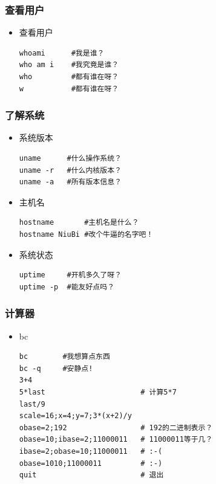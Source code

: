 \documentclass[xcolor=svgnames,bigger,presentation]{beamer}
\begin{document}
\begin{frame}[fragile]
\frametitle{查看用户}
\label{sec-4-2-6}
\begin{itemize}

\item 查看用户\\
\label{sec-4-2-6-1}%
\begin{verbatim}
whoami      #我是谁？
who am i    #我究竟是谁？
who         #都有谁在呀？
w           #都有谁在呀？
\end{verbatim}
\end{itemize} %
\end{frame}
\begin{frame}[fragile]
\frametitle{了解系统}
\label{sec-4-2-7}
\begin{itemize}

\item 系统版本\\
\label{sec-4-2-7-1}%
\begin{verbatim}
uname      #什么操作系统？
uname -r   #什么内核版本？
uname -a   #所有版本信息？
\end{verbatim}

\item 主机名\\
\label{sec-4-2-7-2}%
\begin{verbatim}
hostname       #主机名是什么？
hostname NiuBi #改个牛逼的名字吧！
\end{verbatim}

\item 系统状态\\
\label{sec-4-2-7-3}%
\begin{verbatim}
uptime     #开机多久了呀？
uptime -p  #能友好点吗？
\end{verbatim}
\end{itemize} %
\end{frame}
\begin{frame}[fragile]
\frametitle{计算器}
\label{sec-4-2-8}
\begin{itemize}

\item bc\\
\label{sec-4-2-8-1}%
\begin{verbatim}
bc        #我想算点东西
bc -q     #安静点!
3+4
5*last                      # 计算5*7
last/9
scale=16;x=4;y=7;3*(x+2)/y
obase=2;192                 # 192的二进制表示？
obase=10;ibase=2;11000011   # 11000011等于几？
ibase=2;obase=10;11000011   # :-(
obase=1010;11000011         # :-)
quit                        # 退出
\end{verbatim}
\end{itemize} %
\end{frame}
\end{document}
